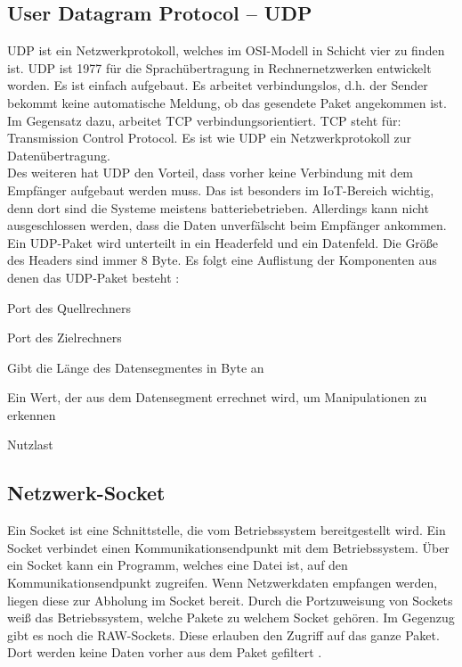 \subsection{User Datagram Protocol -- UDP}
UDP ist ein Netzwerkprotokoll, welches im OSI-Modell in Schicht vier zu finden ist. UDP ist 1977 für die Sprachübertragung in Rechnernetzwerken entwickelt worden. Es ist einfach aufgebaut. Es arbeitet verbindungslos, d.h. der Sender bekommt keine automatische Meldung, ob das gesendete Paket angekommen ist. Im Gegensatz dazu, arbeitet TCP verbindungsorientiert. TCP steht für: Transmission Control Protocol. Es ist wie UDP ein Netzwerkprotokoll zur Datenübertragung.
\\
Des weiteren hat UDP den Vorteil, dass vorher keine Verbindung mit dem Empfänger aufgebaut werden muss. Das ist besonders im IoT-Bereich wichtig, denn dort sind die Systeme meistens batteriebetrieben. Allerdings kann nicht ausgeschlossen werden, dass die Daten unverfälscht beim Empfänger ankommen.
\\
Ein UDP-Paket wird unterteilt in ein Headerfeld und ein Datenfeld. Die Größe des Headers sind immer 8 Byte. Es folgt eine Auflistung der Komponenten aus denen das UDP-Paket besteht \cite{src_UDP}:
\\
\begin{description}[style=multiline,leftmargin=3cm]
\item [Quellport] 	Port des Quellrechners
\item [Zielport]  	Port des Zielrechners
\item [Länge]		Gibt die Länge des Datensegmentes in Byte an
\item [Prüfsumme]	Ein Wert, der aus dem Datensegment errechnet wird, um Manipulationen zu erkennen
\item [Daten]		Nutzlast
\end{description}

\subsection{Netzwerk-Socket}
Ein Socket ist eine Schnittstelle, die vom Betriebssystem bereitgestellt wird. Ein Socket verbindet einen Kommunikationsendpunkt mit dem Betriebssystem. Über ein Socket kann ein Programm, welches eine Datei ist, auf den Kommunikationsendpunkt zugreifen. Wenn Netzwerkdaten empfangen werden, liegen diese zur Abholung im Socket bereit. 
Durch die Portzuweisung von Sockets weiß das Betriebssystem, welche Pakete zu welchem Socket gehören. Im Gegenzug gibt es noch die RAW-Sockets. Diese erlauben den Zugriff auf das ganze Paket. Dort werden keine Daten vorher aus dem Paket gefiltert \cite{src_SOCKET}.

